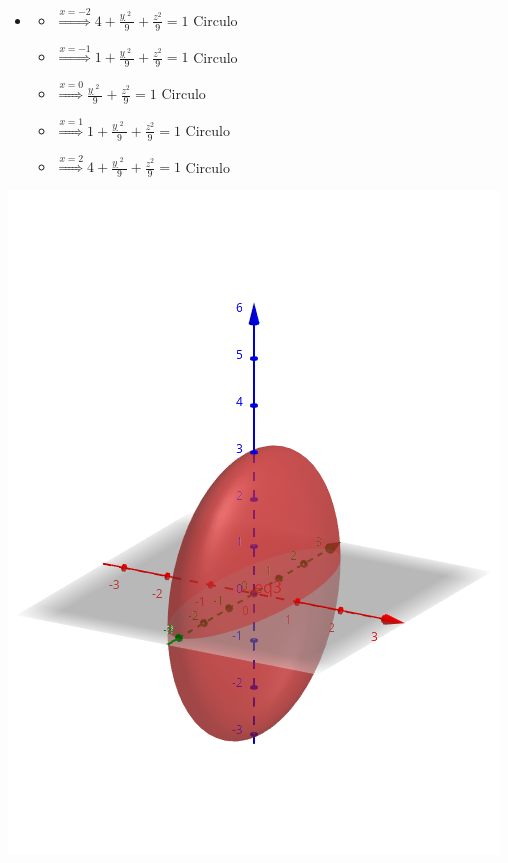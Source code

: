\documentclass[../practica_02.tex]{subfiles}
\begin{document}
\begin{enumerate}
\begin{enumerate}
\begin{itemize}
                        \item
                            \begin{itemize}
                                \item $\stackrel{x=-2}{\Rightarrow} 4 + \frac{ỵ^2}{9} + \frac{z^2}{9} = 1$ Circulo
                                \item $\stackrel{x=-1}{\Rightarrow} 1 + \frac{ỵ^2}{9} + \frac{z^2}{9} = 1$ Circulo
                                \item $\stackrel{x=0}{\Rightarrow} \frac{ỵ^2}{9} + \frac{z^2}{9} = 1$ Circulo
                                \item $\stackrel{x=1}{\Rightarrow} 1 + \frac{ỵ^2}{9} + \frac{z^2}{9} = 1$ Circulo
                                \item $\stackrel{x=2}{\Rightarrow} 4 + \frac{ỵ^2}{9} + \frac{z^2}{9} = 1$ Circulo
                            \end{itemize}

                    \end{itemize}

                    \includegraphics[scale=0.4]{ej07/resources/1a.png} $ $


\end{enumerate}
\end{enumerate}
\end{document}
